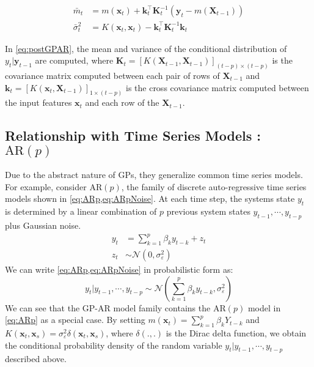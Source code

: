\begin{equation}\label{eq:postGPAR}
    \begin{aligned}
        \bar{m}_t &= m(\mathbf{x}_t) + 
        \mathbf{k}_{t}^{\intercal}\mathbf{K}_{t}^{-1}\left( \mathbf{y}_t - m(\mathbf{X}_{t-1}) \right) \\
        \bar{\sigma}^{2}_{t} &= K(\mathbf{x}_t, \mathbf{x}_t) - 
        \mathbf{k}_{t}^{\intercal} \mathbf{K}_{t}^{-1} \mathbf{k}_{t}
    \end{aligned}
\end{equation}

In \cref{eq:postGPAR}, the mean and variance of the conditional distribution of $y_t \rvert \mathbf{y}_{t-1}$ are 
computed, where $\mathbf{K}_{t} = [K(\mathbf{X}_{t-1}, \mathbf{X}_{t-1})]_{(t-p) \times (t-p)}$ is the 
covariance matrix computed between each pair of rows of $\mathbf{X}_{t-1}$ and 
$\mathbf{k}_{t} = [K(\mathbf{x}_t, \mathbf{X}_{t-1})]_{1 \times (t-p)}$ is the cross covariance matrix computed 
between the input features $\mathbf{x}_t$ and each row of the $\mathbf{X}_{t-1}$.

\subsection*{Relationship with Time Series Models : $\mathrm{AR}(p)$}

Due to the abstract nature of GPs, they generalize common time series models. For example, consider 
$\mathrm{AR}(p)$, the family of discrete auto-regressive time series models shown in \cref{eq:ARp,eq:ARpNoise}. 
At each time step, the systems state $y_t$ is determined by a linear combination of $p$ previous system states 
$y_{t-1}, \cdots, y_{t-p}$ plus Gaussian noise.  
%
\begin{align}
    y_t &= \sum^{p}_{k = 1}{\beta_{k}y_{t-k}} + z_t \label{eq:ARp} \\
    z_t &\sim \mathcal{N}(0, \sigma^{2}_{\varepsilon})\label{eq:ARpNoise}
\end{align}
%
We can write \cref{eq:ARp,eq:ARpNoise} in probabilistic form as: 
\begin{equation*}
    y_t \rvert y_{t-1}, \cdots, y_{t-p} \sim \mathcal{N}(\sum^{p}_{k = 1}{\beta_{k}y_{t-k}}, \sigma^{2}_{\varepsilon})
\end{equation*}
%
We can see that the GP-AR model family contains the $\mathrm{AR}(p)$ model in \cref{eq:ARp} as a special case. 
By setting $m(\mathbf{x}_t) = \sum^{p}_{k = 1}{\beta_{k}Y_{t-k}}$ and 
$K(\mathbf{x}_t, \mathbf{x}_s) = \sigma^2_{\varepsilon}\delta(\mathbf{x}_t, \mathbf{x}_s)$, where $\delta(.,.)$ 
is the Dirac delta function, we obtain the conditional probability density of the random variable 
$y_t \rvert y_{t-1}, \cdots, y_{t-p}$ described above.

